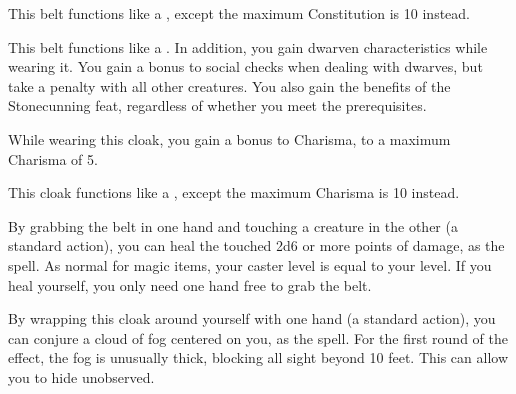 
 This belt functions like a , except the maximum Constitution is 10 instead.


 This belt functions like a . In addition, you gain dwarven characteristics while wearing it. You gain a  bonus to social checks when dealing with dwarves, but take a  penalty with all other creatures. You also gain the benefits of the Stonecunning feat, regardless of whether you meet the prerequisites.


 While wearing this cloak, you gain a  bonus to Charisma, to a maximum Charisma of 5.


 This cloak functions like a , except the maximum Charisma is 10 instead.


 By grabbing the belt in one hand and touching a creature in the other (a standard action), you can heal the touched 2d6 or more points of damage, as the  spell. As normal for magic items, your caster level is equal to your level. If you heal yourself, you only need one hand free to grab the belt.


 By wrapping this cloak around yourself with one hand (a standard action), you can conjure a cloud of fog centered on you, as the  spell. For the first round of the effect, the fog is unusually thick, blocking all sight beyond 10 feet. This can allow you to hide unobserved.

